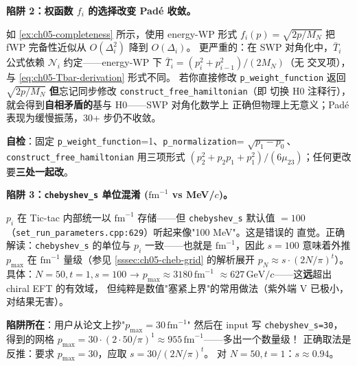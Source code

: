 \begin{pitfallbox}[label={box:ch05-pitfall-weight-padé}]
\textbf{陷阱 2：权函数 \(f_i\) 的选择改变 Padé 收敛。}

如 \cref{ex:ch05-completeness} 所示，使用 energy-WP 形式
\(f_i(p) = \sqrt{2p/M_N}\) 把 fWP 完备性近似从 \(O(\Delta_i^2)\)
降到 \(O(\Delta_i)\)。
更严重的：在 SWP 对角化中，\(\bar{T}_i\) 公式依赖 \(\mathcal{N}_i\)
约定——energy-WP 下 \(\bar{T}_i = (p_i^2 + p_{i-1}^2)/(2 M_N)\)（无
交叉项），与 \cref{eq:ch05-Tbar-derivation} 形式不同。
若你直接修改 \texttt{p\_weight\_function} 返回 \(\sqrt{2p/M_N}\)
\textbf{但}忘记同步修改 \texttt{construct\_free\_hamiltonian}（即
切换 H0 注释行），就会得到\textbf{自相矛盾的}基与 H0——SWP 对角化数学上
正确但物理上无意义；Padé 表现为缓慢振荡，30+ 步仍不收敛。

\textbf{自检}：固定 \texttt{p\_weight\_function}=1、\texttt{p\_normalization}=
\(\sqrt{p_1 - p_0}\)、\texttt{construct\_free\_hamiltonian} 用三项形式
\((p_2^2 + p_2 p_1 + p_1^2) / (6\mu_{23})\)；任何更改要\textbf{三处一起改}。
\end{pitfallbox}

\begin{pitfallbox}[label={box:ch05-pitfall-cheb-units}]
\textbf{陷阱 3：\texttt{chebyshev\_s} 单位混淆 (\(\mathrm{fm}^{-1}\) vs MeV/\(c\))。}

\(p_i\) 在 Tic-tac 内部统一以 \(\mathrm{fm}^{-1}\) 存储——但
\texttt{chebyshev\_s} 默认值 \(= 100\)
（\texttt{set\_run\_parameters.cpp:629}）听起来像"100 MeV"。这是错误的
直觉。正确解读：\texttt{chebyshev\_s} 的单位与 \(p_i\) 一致——也就是
\(\mathrm{fm}^{-1}\)，因此 \(s = 100\) 意味着外推 \(p_{\max}\) 在
\(\mathrm{fm}^{-1}\) 量级（参见 \cref{sssec:ch05-cheb-grid} 的解析展开
\(p_N \approx s \cdot (2N/\pi)^t\)）。
具体：\(N = 50, t = 1, s = 100\) → \(p_{\max} \approx 3180\,\mathrm{fm}^{-1}\)
\(\approx 627\,\mathrm{GeV}/c\)——这\textbf{远}超出 chiral EFT 的有效域，
但纯粹是数值"塞紧上界"的常用做法（紫外端 V 已极小，对结果无害）。

\textbf{陷阱所在}：用户从论文上抄"\(p_{\max} = 30\,\mathrm{fm}^{-1}\)"
然后在 input 写 \texttt{chebyshev\_s=30}，
得到的网格 \(p_{\max} = 30 \cdot (2 \cdot 50 / \pi)^1
\approx 955\,\mathrm{fm}^{-1}\)——多出一个数量级！
正确取法是反推：要求 \(p_{\max} = 30\)，应取 \(s = 30 / (2N/\pi)^t\)。
对 \(N = 50, t = 1\)：\(s \approx 0.94\)。
\end{pitfallbox}

